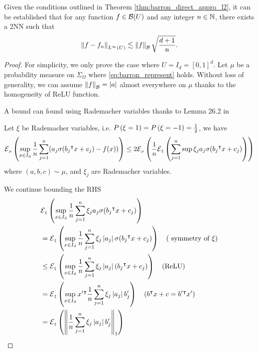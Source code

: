 
\begin{theorem}
    Given the conditions outlined in Theorem \ref{thm:barron_direct_appro_l2},
    it can be established that for any function $f \in \mathcal{B}(U)$ and any
    integer $n \in \mathbb{N}$, there exists a 2NN such that
    \begin{equation}
        \left\| f - f_n \right\|_{L^{\infty}(U)} \lesssim 
        \left\| f \right\|_{\mathcal{B}} \sqrt{\frac{d+1}{n}}.
    \end{equation}
\end{theorem}

\begin{proof}
    For simplicity, we only prove the case where $U = I_d = [0,1]^d$. 
    Let $\mu$ be a probability measure on $\Sigma_{\Omega}$ where
    \eqref{eq:barron_represent} holds. Without loss of generality, we can assume
    $\left\| f \right\|_{\mathcal{B}} = \left| a \right|$ almost everywhere on $\mu$ thanks to the
    homogeneity of ReLU function.

    A bound can found using Rademacher variables thanks to Lemma 26.2 in \cite[
    p. 376]{shalev-shwartzUnderstandingMachineLearning2014}

    Let $\xi$ be Rademacher variables, i.e. $\PR{\xi=1} = \PR{\xi=-1} =
    \frac{1}{2}$, we have
    \begin{equation}
        \label{eq:proof_l_infty_fouier_1}
        \ERWi{\mu}{\sup_{x\in I_d} 
        \frac{1}{n} \sum_{j=1}^n (a_j\sigma(b_j\tr x + c_j) - f(x))}
        \leq 
        2 \ERWi{\mu}{
            \frac{1}{n} 
            \ERWi{\xi}{
                \sum_{j=1}^n \sup \xi_j a_j\sigma(b_j\tr x + c_j)
            }
        }
    \end{equation}
    where $(a,b,c)\sim\mu$, and $\xi_j$ are Rademacher variables.

    We continue bounding the RHS
    \begin{align}
        &\ERWi{\xi}{
            \sup_{x\in I_d} \frac{1}{n}\sum_{j=1}^{n} \xi_j a_j\sigma(b_j\tr x + c_j)
        } \\
        &= \ERWi{\xi}{
            \sup_{x\in I_d} \frac{1}{n}\sum_{j=1}^{n} \xi_j \abs{a_j} \sigma(b_j\tr x + c_j)
        } \quad
        (\text{ symmetry of $\xi$}) \\
        &\leq \ERWi{\xi}{
            \sup_{x\in I_d} \frac{1}{n}\sum_{j=1}^{n} \xi_j \abs{a_j}(b_j\tr x + c_j)
        } \quad 
        (\text{ReLU}) \\
        &= \ERWi{\xi}{
            \sup_{x\in I_d} x'\tr \frac{1}{n}\sum_{j=1}^{n} \xi_j \abs{a_j}b_j'
        }
        \quad (b\tr x + c = b'\tr x') \\
        &= \ERWi{\xi}{\norm{
            \frac{1}{n} \sum_{j=1}^{n}\xi_j\abs{a_j}b_j'}_1
        }
    \end{align}


\end{proof}
